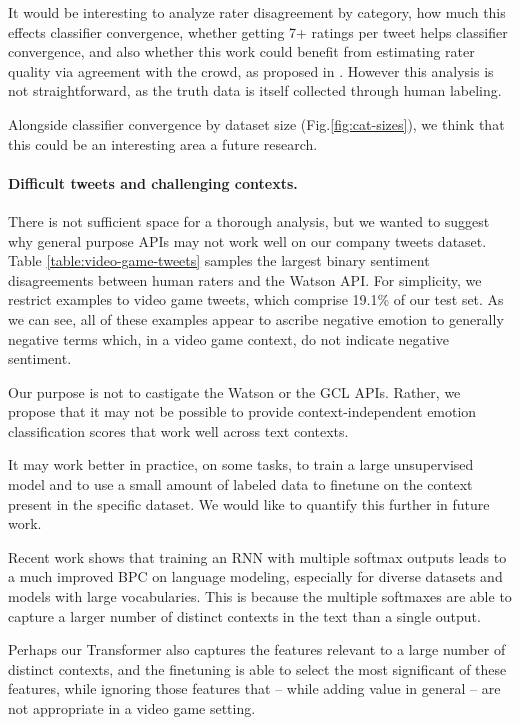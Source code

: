 \documentclass[letterpaper]{article} \usepackage{aaai19}  \usepackage{times}  \usepackage{helvet}  \usepackage{courier}  \usepackage{url}  \usepackage{graphicx}  \usepackage{booktabs}
\begin{document}
It would be interesting to analyze rater disagreement by category, how much this effects classifier convergence, whether getting 7+ ratings per tweet helps classifier convergence, and also whether this work could benefit from estimating rater quality via agreement with the crowd, as proposed in \cite{NoisyLabelHumanAWS2017}. However this analysis is not straightforward, as the truth data is itself collected through human labeling. 

Alongside classifier convergence by dataset size (Fig.\ref{fig:cat-sizes}), we think that this could be an interesting area a future research.


\paragraph{Difficult tweets and challenging contexts.}
There is not sufficient space for a thorough analysis, but we wanted to suggest why general purpose APIs may not work well on our company tweets dataset. Table \ref{table:video-game-tweets} samples the largest binary sentiment disagreements between human raters and the Watson API. For simplicity, we restrict examples to video game tweets, which comprise 19.1\% of our test set. As we can see, all of these examples appear to ascribe negative emotion to generally negative terms which, in a video game context, do not indicate negative sentiment.

Our purpose is not to castigate the Watson or the GCL APIs. Rather, we propose that it may not be possible to provide context-independent emotion classification scores that work well across text contexts. 

It may work better in practice, on some tasks, to train a large unsupervised model and to use a small amount of labeled data to finetune on the context present in the specific dataset. We would like to quantify this further in future work. 

Recent work \cite{SoftmaxBottleneck2017} shows that training an RNN with multiple softmax outputs leads to a much improved BPC on language modeling, especially for diverse datasets and models with large vocabularies. This is because the multiple softmaxes are able to capture a larger number of distinct contexts in the text than a single output. 

Perhaps our Transformer also captures the features relevant to a large number of distinct contexts, and the finetuning is able to select the most significant of these features, while ignoring those features that -- while adding value in general -- are not appropriate in a video game setting. 
\end{document}
